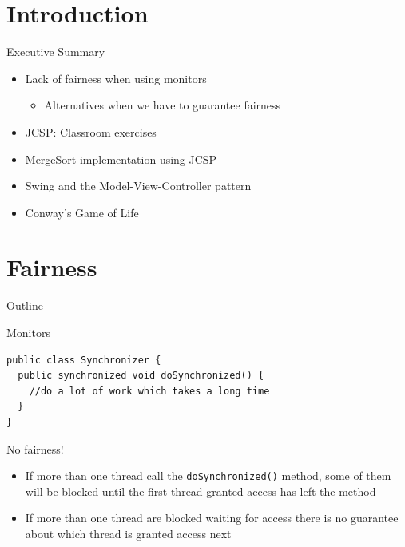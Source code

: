 \section*{Introduction}

\begin{frame}{Executive Summary}
  \begin{itemize}
  \item Lack of fairness when using monitors
    \begin{itemize}
    \item Alternatives when we have to guarantee fairness
    \end{itemize}
  \item JCSP: Classroom exercises
  \item MergeSort implementation using JCSP
  \item Swing and the Model-View-Controller pattern
  \item Conway's Game of Life
  \end{itemize}
\end{frame}


\section{Fairness}

\begin{frame}{Outline}
  \tableofcontents[current]
\end{frame}

\begin{frame}[fragile]{Monitors}
\begin{lstlisting}
public class Synchronizer {
  public synchronized void doSynchronized() {
    //do a lot of work which takes a long time
  }
}
\end{lstlisting}


  \begin{alertblock}{No fairness!}
    \begin{itemize}
    \item If more than one thread call the
      \lstinline!doSynchronized()!  method, some of them will be
      blocked until the first thread granted access has left the
      method
    \item If more than one thread are blocked waiting for access there
      is no guarantee about which thread is granted access next
    \end{itemize}
  \end{alertblock}
\end{frame}

